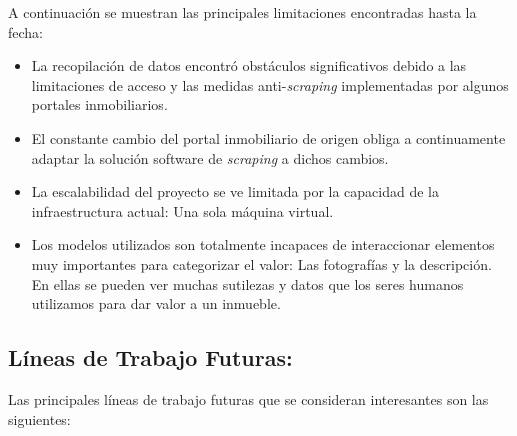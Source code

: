 A continuación se muestran las principales limitaciones encontradas hasta la fecha:

\begin{itemize}
  \item La recopilación de datos encontró obstáculos significativos debido a las limitaciones de acceso y las medidas anti-\textit{scraping} implementadas por algunos portales inmobiliarios. 
  \item El constante cambio del portal inmobiliario de origen obliga a continuamente adaptar la solución software de \textit{scraping} a dichos cambios. 
  \item La escalabilidad del proyecto se ve limitada por la capacidad de la infraestructura actual: Una sola máquina virtual.
  \item Los modelos utilizados son totalmente incapaces de interaccionar elementos muy importantes para categorizar el valor: Las fotografías y la descripción. En ellas se pueden ver muchas sutilezas y datos que los seres humanos utilizamos para dar valor a un inmueble.
\end{itemize}

\clearpage
\subsection*{Líneas de Trabajo Futuras:}

Las principales líneas de trabajo futuras que se consideran interesantes son las siguientes:

